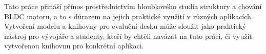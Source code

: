 Tato práce přináší přínos prostřednictvím hloubkového studia struktury a chování BLDC motoru, a to s důrazem na jejich praktické 
využití v různých aplikacích. Vytvoření modelu a knihovny pro evaluční desku může sloužit jako praktický nástroj pro vývojáře a studenty, kteří
by chtěli navázat na tuto práci, či využít vytvořenou knihovnu pro konkrétní aplikaci.




